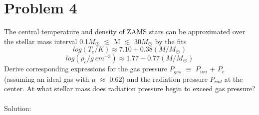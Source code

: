 \documentclass[10pt]{article}
\begin{document}
\section*{Problem 4}
The central temperature and density of ZAMS stars can be approximated over the stellar mass interval 0.1$M_{\astrosun}$ $\lesssim$ M $\lesssim$ 30$M_{\astrosun}$ by the fits 
\[ log(T_c/K) \approx 7.10 + 0.38 (M/M_{\astrosun}) \]
\[ log(\rho_c/g\ cm^{-3}) \approx 1.77 - 0.77 (M/M_{\astrosun}) \]
Derive corresponding expressions for the gas pressure $P_{gas}$ $\equiv$ $P_{ion}$ + $P_{e}$ (assuming an ideal gas with $\mu$ $\approx$ 0.62) and the radiation pressure $P_{rad}$ at the center. At what stellar mass does radiation pressure begin to exceed gas pressure?\\ \\
Solution:
\setlength{\parindent}{1cm}
\end{document}
